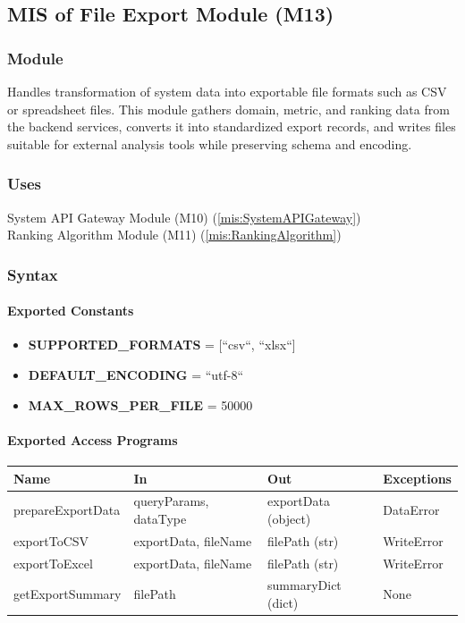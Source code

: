 \documentclass[12pt, titlepage]{article}
\begin{document}
\begin{itemize}
\subsection{MIS of File Export Module (M13)}
  \label{mis:FileExportModule}

  \subsubsection{Module}
  Handles transformation of system data into exportable file formats such as CSV
  or spreadsheet files. This module gathers domain, metric, and ranking data from
  the backend services, converts it into standardized export records, and writes
  files suitable for external analysis tools while preserving schema and encoding.

  \subsubsection{Uses}
  System API Gateway Module (M10)  (\ref{mis:SystemAPIGateway})\\
  Ranking Algorithm Module (M11)  (\ref{mis:RankingAlgorithm})

  \subsubsection{Syntax}

  \paragraph{Exported Constants}
  \begin{itemize}
    \item \textbf{SUPPORTED\_FORMATS} = [``csv``, ``xlsx``]
    \item \textbf{DEFAULT\_ENCODING} = ``utf-8``
    \item \textbf{MAX\_ROWS\_PER\_FILE} = 50000
  \end{itemize}

  \paragraph{Exported Access Programs}
  \begin{center}
  \renewcommand{\arraystretch}{1.2}
  \begin{tabularx}{\textwidth}{l X X l}
  \toprule
  \textbf{Name} & \textbf{In} & \textbf{Out} & \textbf{Exceptions}\\
  \midrule
  prepareExportData & queryParams, dataType & exportData (object) & DataError \\
  exportToCSV & exportData, fileName & filePath (str) & WriteError \\
  exportToExcel & exportData, fileName & filePath (str) & WriteError \\
  getExportSummary & filePath & summaryDict (dict) & None \\
  \bottomrule
  \end{tabularx}
  \end{center}


\end{itemize}
\end{document}
